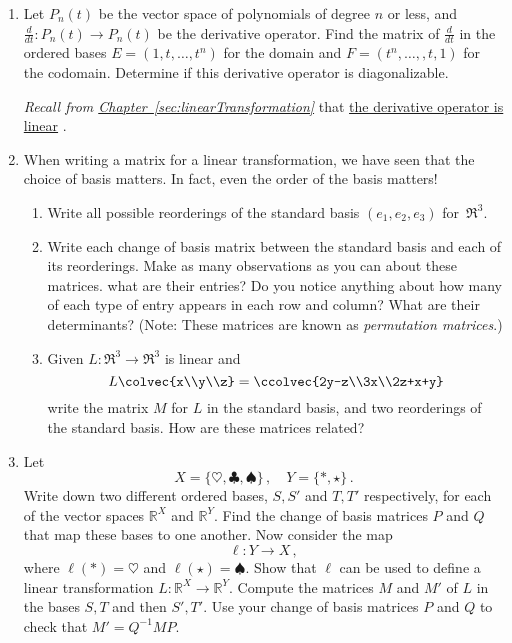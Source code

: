 


\begin{enumerate}
\item Let $P_n(t)$ be the vector space of polynomials of degree $n$ or less, and $\frac{d}{dt} \colon P_n(t) \to P_{n}(t)$ be the derivative operator.  Find the matrix of $\frac{d}{dt}$ in the ordered bases $E=(1,t,\ldots,t^n )$ for the domain and $F=(t^{n}, \ldots, ,t,1 )$ for the codomain. Determine if this derivative operator is diagonalizable. 

\emph{Recall from 
\hyperref[sec:linearTransformation]{Chapter~\ref*{sec:linearTransformation}}} 
that \hyperlink{derivative_linear}{the derivative operator is linear} .


\item When writing a matrix for a linear transformation, we have seen that the choice of basis matters.  In fact, even the order of the basis matters!
\begin{enumerate}
\item Write all possible reorderings of the standard basis $(e_1,e_2,e_3)$ for~$\Re^3$.
\item Write each change of basis matrix between the standard basis and each of its reorderings.  Make as many observations as you can about these matrices. what are their entries? Do you notice anything about how many of each type of entry appears in each row and column? What are their determinants?  (Note: These matrices are known as \emph{permutation matrices}.)
\item Given $L:\Re^3\to \Re^3$ is linear and  
\[
L\colvec{x\\y\\z}=\ccolvec{2y-z\\3x\\2z+x+y}
\] 
write the matrix $M$ for $L$ in the standard basis, and two reorderings of the standard basis.  How are these matrices related?
\end{enumerate}


\item Let \[X=\{\heartsuit,\clubsuit,\spadesuit\}\, ,\quad Y=\{*,\star\}\, .\] Write down two different ordered bases, $S,S'$ and $T,T'$ respectively, for each of the vector spaces ${\mathbb R}^X$ and ${\mathbb R}^Y$. Find the change of basis matrices $P$ and $Q$ that map these bases to one another. Now consider the map
\[
\ell:Y\to X\, ,
\]
where $\ell(*)=\heartsuit$ and $\ell(\star)=\spadesuit$. Show that $\ell$ can be used to define a linear transformation $L:{\mathbb R}^X\to{\mathbb R}^Y$. Compute the matrices $M$ and $M'$ of $L$ in the bases $S,T$ and then $S',T'$. Use your change of basis matrices $P$ and $Q$ to 
check that $M'=Q^{-1}MP$.


\end{enumerate}
